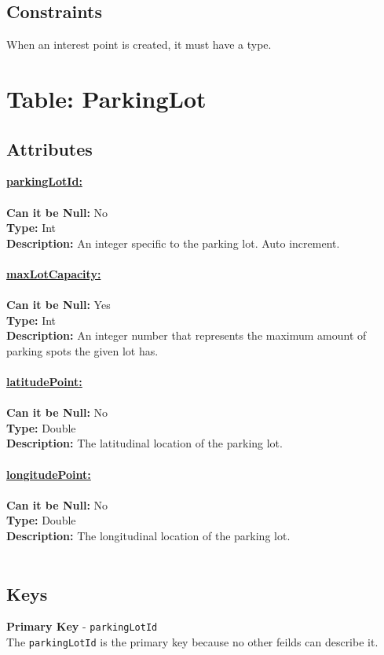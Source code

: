 \subsection{Constraints}
When an interest point is created, it must have a type.



\newpage
\section{Table: ParkingLot}
\subsection{Attributes}
\textbf{\underline{parkingLotId:}}\\
\\
\textbf{Can it be Null:} No\\
\textbf{Type:} Int\\
\textbf{Description:}
An integer specific to the parking lot. Auto increment.\\\\
\textbf{\underline{maxLotCapacity:}}\\
\\
\textbf{Can it be Null:} Yes\\
\textbf{Type:} Int\\
\textbf{Description:}
An integer number that represents the maximum amount of parking spots the given lot has.\\\\
\textbf{\underline{latitudePoint:}}\\
\\
\textbf{Can it be Null:} No\\
\textbf{Type:} Double\\
\textbf{Description:}
The latitudinal location of the parking lot. \\\\
\textbf{\underline{longitudePoint:}}\\
\\
\textbf{Can it be Null:} No\\
\textbf{Type:} Double\\
\textbf{Description:}
The longitudinal location of the parking lot.\\\\
\subsection{Keys}
\textbf{Primary Key} - \texttt{parkingLotId}\\
The \texttt{parkingLotId} is the primary key because no other feilds can describe it.
